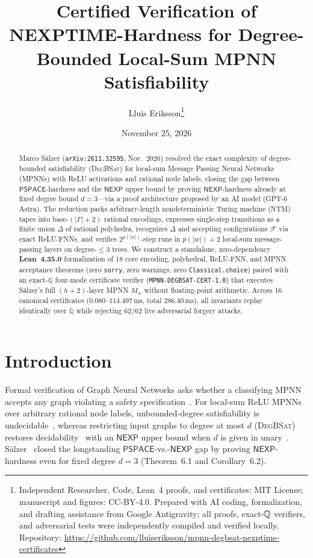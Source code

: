 \documentclass[10pt,twocolumn]{article}
\title{\vspace{-1.1em}\textbf{Certified Verification of NEXPTIME-Hardness for Degree-Bounded Local-Sum MPNN Satisfiability}}
\author{Lluis Eriksson\thanks{Independent Researcher. Code, Lean~4 proofs, and certificates: MIT License; manuscript and figures: CC-BY-4.0. Prepared with AI coding, formalization, and drafting assistance from Google Antigravity; all proofs, exact-$\QQ$ verifiers, and adversarial tests were independently compiled and verified locally. Repository: \url{https://github.com/lluiseriksson/mpnn-degbsat-nexptime-certificates}}}
\date{November 25, 2026}
\newcommand{\QQ}{\mathbb{Q}}
\newcommand{\DEGBSAT}{\textsc{DegBSat}}
\newcommand{\NEXP}{\mathsf{NEXP}}
\newcommand{\PSPACE}{\mathsf{PSPACE}}
\begin{document}
\maketitle
\vspace{-1.4em}

\begin{abstract}
Marco S\"alzer (\texttt{arXiv:2611.32595}, Nov.\ 2026) resolved the exact complexity of degree-bounded satisfiability (\DEGBSAT{}) for local-sum Message Passing Neural Networks (MPNNs) with ReLU activations and rational node labels, closing the gap between $\PSPACE$-hardness and the $\NEXP$ upper bound by proving $\NEXP$-hardness already at fixed degree bound $d = 3$---via a proof architecture proposed by an AI model (GPT-6 Astra). The reduction packs arbitrary-length nondeterministic Turing machine (NTM) tapes into base-$(|\Gamma|+2)$ rational encodings, expresses single-step transitions as a finite union $\Delta$ of rational polyhedra, recognizes $\Delta$ and accepting configurations $\mathcal{F}$ via exact ReLU-FNNs, and verifies $2^{p(|w|)}$-step runs in $p(|w|)+2$ local-sum message-passing layers on degree-$\le 3$ trees. We construct a standalone, zero-dependency \textbf{Lean~4.35.0} formalization of 18 core encoding, polyhedral, ReLU-FNN, and MPNN acceptance theorems (zero \texttt{sorry}, zero warnings, zero \texttt{Classical.choice}) paired with an exact-$\QQ$ four-mode certificate verifier (\texttt{MPNN-DEGBSAT-CERT-1.0}) that executes S\"alzer's full $(h+2)$-layer MPNN $M_w$ without floating-point arithmetic. Across 16 canonical certificates ($0.080$--$114.497\,\mathrm{ms}$, total $286.40\,\mathrm{ms}$), all invariants replay identically over $\QQ$ while rejecting 62/62 live adversarial forgery attacks.
\end{abstract}

\section{Introduction}\label{sec:intro}
Formal verification of Graph Neural Networks asks whether a classifying MPNN accepts any graph violating a safety specification~\cite{barcelo2020logical,saelzer2023fundamental}. For local-sum ReLU MPNNs over arbitrary rational node labels, unbounded-degree satisfiability is undecidable~\cite{benedikt2026decidability}, whereas restricting input graphs to degree at most $d$ (\DEGBSAT{}) restores decidability~\cite{saelzer2023fundamental} with an $\NEXP$ upper bound when $d$ is given in unary~\cite{saelzer2025complexity}. S\"alzer~\cite{saelzer2026degbsat} closed the longstanding $\PSPACE$-vs.-$\NEXP$ gap by proving $\NEXP$-hardness even for fixed degree $d = 3$ (Theorem~6.1 and Corollary~6.2).
\end{document}

